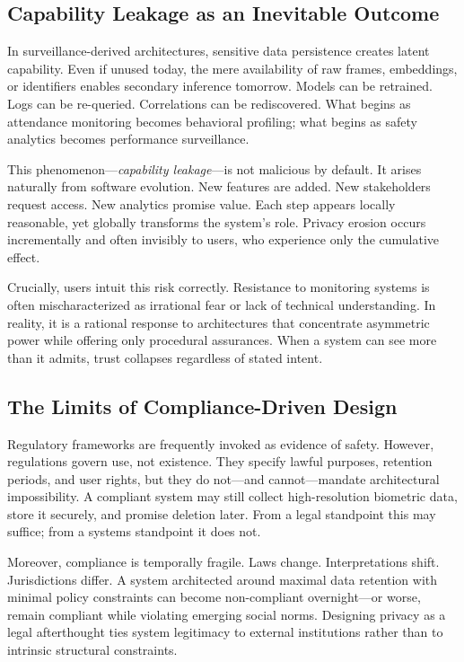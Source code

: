 \documentclass[conference]{IEEEtran}
\begin{document}
\subsection{Capability Leakage as an Inevitable Outcome}
In surveillance-derived architectures, sensitive data persistence creates latent capability. Even if unused today, the mere availability of raw frames, embeddings, or identifiers enables secondary inference tomorrow. Models can be retrained. Logs can be re-queried. Correlations can be rediscovered. What begins as attendance monitoring becomes behavioral profiling; what begins as safety analytics becomes performance surveillance.

This phenomenon---\textit{capability leakage}---is not malicious by default. It arises naturally from software evolution. New features are added. New stakeholders request access. New analytics promise value. Each step appears locally reasonable, yet globally transforms the system's role. Privacy erosion occurs incrementally and often invisibly to users, who experience only the cumulative effect.

Crucially, users intuit this risk correctly. Resistance to monitoring systems is often mischaracterized as irrational fear or lack of technical understanding. In reality, it is a rational response to architectures that concentrate asymmetric power while offering only procedural assurances. When a system can see more than it admits, trust collapses regardless of stated intent.

\subsection{The Limits of Compliance-Driven Design}
Regulatory frameworks are frequently invoked as evidence of safety. However, regulations govern use, not existence. They specify lawful purposes, retention periods, and user rights, but they do not---and cannot---mandate architectural impossibility. A compliant system may still collect high-resolution biometric data, store it securely, and promise deletion later. From a legal standpoint this may suffice; from a systems standpoint it does not.

Moreover, compliance is temporally fragile. Laws change. Interpretations shift. Jurisdictions differ. A system architected around maximal data retention with minimal policy constraints can become non-compliant overnight---or worse, remain compliant while violating emerging social norms. Designing privacy as a legal afterthought ties system legitimacy to external institutions rather than to intrinsic structural constraints.
\end{document}
